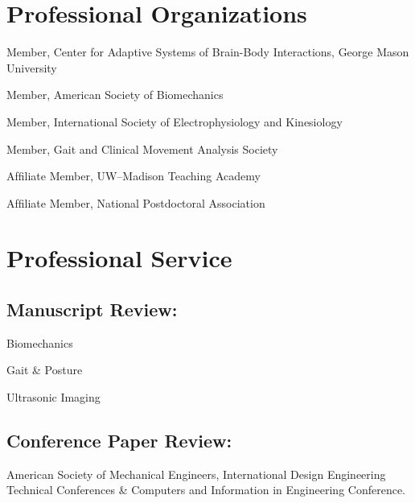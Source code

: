 \documentclass[letterpaper, 10pt]{article}
\begin{document}
\section{Professional Organizations}

\begin{compacthang}
     \item Member, Center for Adaptive Systems of Brain-Body Interactions, George Mason University
     \item Member, American Society of Biomechanics
     \item Member, International Society of Electrophysiology and Kinesiology
     \item Member, Gait and Clinical Movement Analysis Society
     \item Afﬁliate Member, UW--Madison Teaching Academy 
     \item Afﬁliate Member, National Postdoctoral Association
\end{compacthang}

\section{Professional Service}

\subsection{Manuscript Review:}
\setlength{\hangingleftmargin}{2.5em}
\setlength{\hangingindent}{2em}
\begin{compacthang}
    \item Biomechanics
    \item Gait \& Posture
    \item Ultrasonic Imaging
\end{compacthang}

\subsection{Conference Paper Review:}
\begin{compacthang}
    \item American Society of Mechanical Engineers, International Design Engineering Technical Conferences \& Computers and Information in Engineering Conference.
\end{compacthang}
\end{document}
